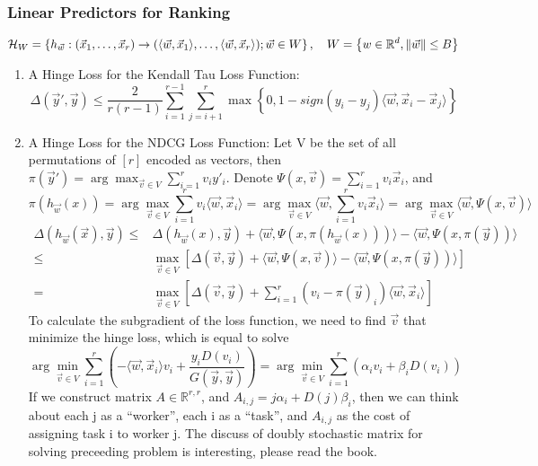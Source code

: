 \subsubsection{Linear Predictors for Ranking}%
\label{ssub:linear_predictors_for_ranking}
\[
    \mathcal{H}_{W} = \left\{ h_{\vec{w}}: (\vec{x}_1, \ldots, \vec{x}_r) \rightarrow (\langle \vec{w}, \vec{x}_1 \rangle, \ldots, \langle \vec{w}, \vec{x}_r \rangle); \vec{w} \in W \right\}, \quad W = \left\{ w \in \mathbb{R}^{d}, \Arrowvert \vec{w} \Arrowvert \le B \right\} 
\]
\begin{enumerate}
    \item A Hinge Loss for the Kendall Tau Loss Function:
        \[
            \Delta(\vec{y}', \vec{y}) \le \frac{2}{r(r-1)} \sum^{r-1}_{i=1} \sum^{r}_{j=i+1} \max \left\{ 0, 1-sign(y_i-y_j)\langle \vec{w}, \vec{x}_i - \vec{x}_j \rangle \right\}
        \]
    \item A Hinge Loss for the NDCG Loss Function:
        Let V be the set of all permutations of $ [r] $ encoded as vectors, then $ \pi(\vec{y}') = \arg\max_{\vec{v} \in V} \sum^{r}_{i=1} v_i y'_i $. Denote $ \Psi(x, \vec{v}) = \sum^{r}_{i=1}  v_i \vec{x}_i $, and
        \[
            \pi(h_{\vec{w}}(x)) = \arg\max_{\vec{v}\in V} \sum^{r}_{i=1} v_i \langle \vec{w}, \vec{x}_i \rangle
            = \arg\max_{\vec{v}\in V}\langle \vec{w}, \sum^{r}_{i=1} v_i \vec{x}_i \rangle
            = \arg\max_{\vec{v}\in V} \langle \vec{w}, \Psi(x, \vec{v}) \rangle 
        \]
        \begin{align*}
            \Delta(h_{\vec{w}}(\vec{x}), \vec{y})
            \le& \Delta(h_{\vec{w}}(x), \vec{y}) + \langle \vec{w}, \Psi(x, \pi(h_{\vec{w}}(x))) \rangle - \langle \vec{w}, \Psi(x, \pi(\vec{y})) \rangle\\
            \le& \max_{\vec{v}\in V}\left[ \Delta(\vec{v}, \vec{y}) + \langle \vec{w}, \Psi(x, \vec{v}) \rangle - \langle \vec{w}, \Psi(x, \pi(\vec{y})) \rangle \right]\\
            =& \max_{\vec{v}\in V} \left[ \Delta(\vec{v}, \vec{y}) + \sum^{r}_{i=1} (v_i - {\pi(\vec{y})}_i) \langle \vec{w}, \vec{x}_i \rangle\right]
        \end{align*}
        To calculate the subgradient of the loss function, we need to find $ \vec{v} $ that minimize the hinge loss, which is equal to solve
        \[
            \arg\min_{\vec{v} \in V} \sum^{r}_{i=1} \left(-\langle \vec{w}, \vec{x}_i \rangle v_i + \frac{y_i D(v_i)}{G(\vec{y}, \vec{y})} \right) = \arg\min_{\vec{v} \in V} \sum^{r}_{i=1} \left( \alpha_i v_i + \beta_i D(v_i) \right)
        \]
        If we construct matrix $ A \in \mathbb{R}^{r, r} $, and $ A_{i, j} = j \alpha_i + D(j) \beta_i $, then we can think about each j as a ``worker'', each i as a ``task'', and $ A_{i,j} $ as the cost of assigning task i to worker j.
        The discuss of doubly stochastic matrix for solving preceeding problem is interesting, please read the book.
\end{enumerate}

